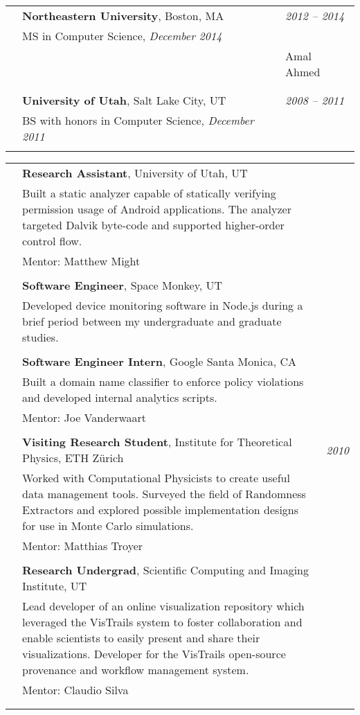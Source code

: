 \documentclass[10pt]{article}
\makeatletter
\newcommand{\category}[2]{
\begin{center}
\vskip 6pt
\begin{tabular*}{\textwidth}{@{}p{0.75in}@{\quad\;\;}p{4in}@{\quad\quad}p{0.7in}}
\vcrush[t]{1in}{\textsc{#1}} &
#2
\end{tabular*}
\end{center}
}
\newcommand{\n}{\\ & }
\newcommand{\nn}{\\ \n}
\newcommand{\DT}[1]{&\hspace{\stretch 1}\textit{#1}}
\newcommand{\conf}[1]{&\hspace{\stretch 1}\crushr{\textit{#1}}}
\newcommand{\ed}[1]{}
\makeatother
\begin{document}

\category{Education}{
  {\bf Northeastern University}, Boston, MA \DT{\ed{September }2012 -- \ed{December }2014}\n
MS in Computer Science, \emph{December 2014}\n
\begin{tabular}{@{}p{0.65in}@{\;\;}l@{}}
  Advisor:&Amal Ahmed\\
\end{tabular}\nn

{\bf University of Utah}, Salt Lake City, UT \DT{\ed{August }2008 -- \ed{December }2011}\n
BS with honors in Computer Science, \emph{December 2011} \n
}


\category{Programming \mbox{~\textit{\&} Research} \mbox{experience}}{

{\bf Research Assistant}, University of Utah, UT \conf{Summer 2012}\n
Built a static analyzer capable of statically verifying permission usage of Android applications.
The analyzer targeted Dalvik byte-code and supported higher-order control flow.\n
Mentor: Matthew Might\nn

{\bf Software Engineer}, Space Monkey, UT \conf{Summer 2012}\n
Developed device monitoring software in Node.js during a brief period between my undergraduate and graduate studies.\nn

{\bf Software Engineer Intern}, Google Santa Monica, CA \conf{2011}\n
Built a domain name classifier to enforce policy violations and developed
internal analytics scripts.\n
Mentor: Joe Vanderwaart\nn

{\bf Visiting Research Student}, Institute for Theoretical Physics, ETH Z\"urich \DT{2010}\n
Worked with Computational Physicists to create useful data management
tools.  Surveyed the field of Randomness Extractors and explored possible
implementation designs for use in Monte Carlo simulations.\n
Mentor: Matthias Troyer\nn

{\bf Research Undergrad}, Scientific Computing and Imaging Institute, UT \conf{2009 -- 2010}\n
Lead developer of an online visualization repository which leveraged the
VisTrails system to foster collaboration and enable scientists to easily
present and share their visualizations.  Developer for the VisTrails
open-source provenance and workflow management system.\n
Mentor: Claudio Silva\nn

}
\end{document}
